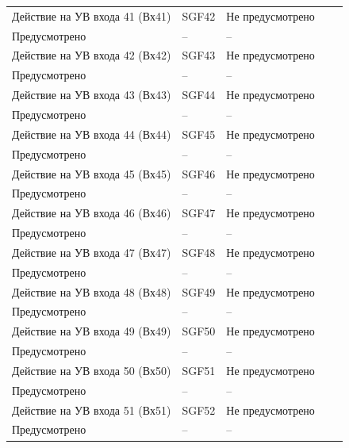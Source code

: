 \begin{longtable}{|>{\centering\arraybackslash}m{5.3cm}|>{\centering\arraybackslash}m{3.3cm}|>{\centering\arraybackslash}m{4.2cm}|>{\centering\arraybackslash}m{1.8cm}|>{\centering\arraybackslash}m{1cm}|}
\hline
\centering Действие на УВ входа 41 (Вх41)  & \centering SGF42 & \centering Не предусмотрено \\ Предусмотрено & \centering -- & \centering \arraybackslash -- \\
\hline
\centering Действие на УВ входа 42 (Вх42)  & \centering SGF43 & \centering Не предусмотрено \\ Предусмотрено & \centering -- & \centering \arraybackslash -- \\
\hline
\centering Действие на УВ входа 43 (Вх43)  & \centering SGF44 & \centering Не предусмотрено \\ Предусмотрено & \centering -- & \centering \arraybackslash -- \\
\hline
\centering Действие на УВ входа 44 (Вх44)  & \centering SGF45 & \centering Не предусмотрено \\ Предусмотрено & \centering -- & \centering \arraybackslash -- \\
\hline
\centering Действие на УВ входа 45 (Вх45)  & \centering SGF46 & \centering Не предусмотрено \\ Предусмотрено & \centering -- & \centering \arraybackslash -- \\
\hline
\centering Действие на УВ входа 46 (Вх46)  & \centering SGF47 & \centering Не предусмотрено \\ Предусмотрено & \centering -- & \centering \arraybackslash -- \\
\hline
\centering Действие на УВ входа 47 (Вх47)  & \centering SGF48 & \centering Не предусмотрено \\ Предусмотрено & \centering -- & \centering \arraybackslash -- \\
\hline
\centering Действие на УВ входа 48 (Вх48)  & \centering SGF49 & \centering Не предусмотрено \\ Предусмотрено & \centering -- & \centering \arraybackslash -- \\
\hline
\centering Действие на УВ входа 49 (Вх49)  & \centering SGF50 & \centering Не предусмотрено \\ Предусмотрено & \centering -- & \centering \arraybackslash -- \\
\hline
\centering Действие на УВ входа 50 (Вх50)  & \centering SGF51 & \centering Не предусмотрено \\ Предусмотрено & \centering -- & \centering \arraybackslash -- \\
\hline
\centering Действие на УВ входа 51 (Вх51)  & \centering SGF52 & \centering Не предусмотрено \\ Предусмотрено & \centering -- & \centering \arraybackslash -- \\

\end{longtable}
